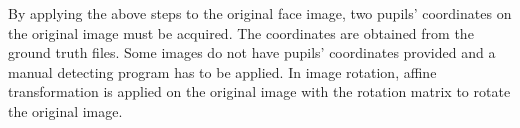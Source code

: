 By applying the above steps to the original face image, two pupils' coordinates on the original image must be acquired. The coordinates are obtained from the ground truth files. Some images do not have pupils' coordinates provided and a manual detecting program has to be applied. 
In image rotation, affine transformation \cite{Jain1989,Horn1986} is applied on the original image with the rotation matrix to rotate the original image. 

